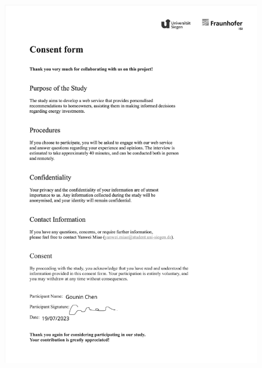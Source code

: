 \begin{figure}[h]
    \centering
    \includegraphics[width=\textwidth]{Images/consent_c.jpg}
\end{figure}

